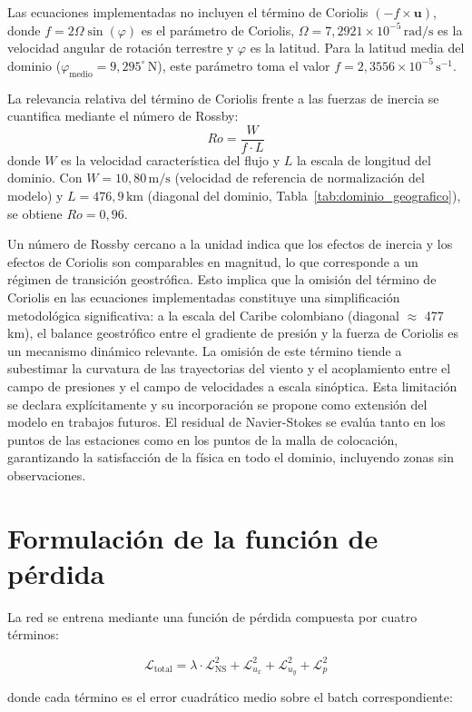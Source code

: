 Las ecuaciones implementadas no incluyen el término de Coriolis $(-f \times \mathbf{u})$, donde $f = 2\Omega\sin(\varphi)$ es el parámetro de Coriolis, $\Omega = 7{,}2921 \times 10^{-5}\,\text{rad/s}$ es la velocidad angular de rotación terrestre y $\varphi$ es la latitud. Para la latitud media del dominio ($\varphi_{\text{medio}} = 9{,}295^{\circ}\,\text{N}$), este parámetro toma el valor $f = 2{,}3556 \times 10^{-5}\,\text{s}^{-1}$.

La relevancia relativa del término de Coriolis frente a las fuerzas de inercia se cuantifica mediante el número de Rossby:
\[
Ro = \frac{W}{f \cdot L}
\]
donde $W$ es la velocidad característica del flujo y $L$ la escala de longitud del dominio. Con $W = 10{,}80\,\text{m/s}$ (velocidad de referencia de normalización del modelo) y $L = 476{,}9\,\text{km}$ (diagonal del dominio, Tabla~\ref{tab:dominio_geografico}), se obtiene $Ro = 0{,}96$.

Un número de Rossby cercano a la unidad indica que los efectos de inercia y los efectos de Coriolis son comparables en magnitud, lo que corresponde a un régimen de transición geostrófica. Esto implica que la omisión del término de Coriolis en las ecuaciones implementadas constituye una simplificación metodológica significativa: a la escala del Caribe colombiano (diagonal $\approx$ 477\,km), el balance geostrófico entre el gradiente de presión y la fuerza de Coriolis es un mecanismo dinámico relevante. La omisión de este término tiende a subestimar la curvatura de las trayectorias del viento y el acoplamiento entre el campo de presiones y el campo de velocidades a escala sinóptica. Esta limitación se declara explícitamente y su incorporación se propone como extensión del modelo en trabajos futuros.
El residual de Navier-Stokes se evalúa tanto en los puntos de las estaciones como en los puntos de la malla de colocación, garantizando la satisfacción de la física en todo el dominio, incluyendo zonas sin observaciones.

\section{Formulación de la función de pérdida}

La red se entrena mediante una función de pérdida compuesta por cuatro términos:

\[
\mathcal{L}_{\text{total}} = \lambda \cdot \mathcal{L}_{\text{NS}}^2 + \mathcal{L}_{u_x}^2 + \mathcal{L}_{u_y}^2 + \mathcal{L}_p^2
\]

donde cada término es el error cuadrático medio sobre el batch correspondiente:

